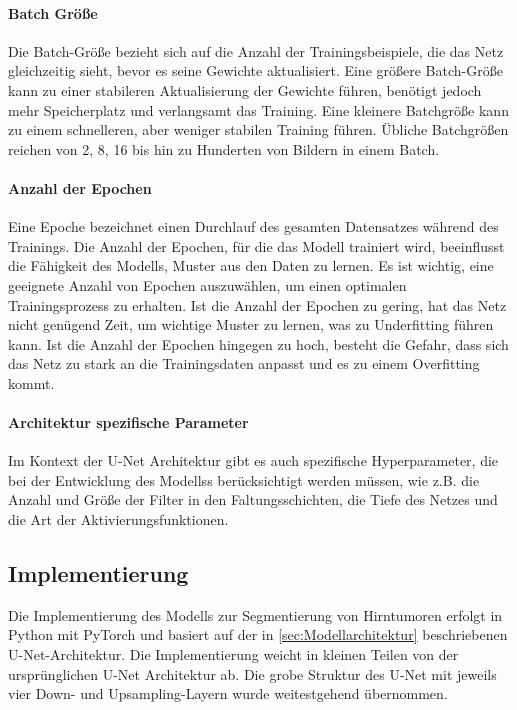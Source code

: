 \paragraph{Batch Größe} Die Batch-Größe bezieht sich auf die Anzahl der Trainingsbeispiele, die das Netz gleichzeitig sieht, bevor es seine Gewichte aktualisiert. Eine größere Batch-Größe kann zu einer stabileren Aktualisierung der Gewichte führen, benötigt jedoch mehr Speicherplatz und verlangsamt das Training. Eine kleinere Batchgröße kann zu einem schnelleren, aber weniger stabilen Training führen. Übliche Batchgrößen reichen von 2, 8, 16 bis hin zu Hunderten von Bildern in einem Batch. \cite[vgl.][]{Yu2020}

\paragraph{Anzahl der Epochen} Eine Epoche bezeichnet einen Durchlauf des gesamten Datensatzes während des Trainings. Die Anzahl der Epochen, für die das \gls{Modell} trainiert wird, beeinflusst die Fähigkeit des Modells, Muster aus den Daten zu lernen. Es ist wichtig, eine geeignete Anzahl von Epochen auszuwählen, um einen optimalen Trainingsprozess zu erhalten. Ist die Anzahl der Epochen zu gering, hat das Netz nicht genügend Zeit, um wichtige Muster zu lernen, was zu Underfitting führen kann. Ist die Anzahl der Epochen hingegen zu hoch, besteht die Gefahr, dass sich das Netz zu stark an die Trainingsdaten anpasst und es zu einem Overfitting kommt. \cite[vgl.][]{Goodfellow2016}

\paragraph{Architektur spezifische Parameter} Im Kontext der U-Net Architektur gibt es auch spezifische Hyperparameter, die bei der Entwicklung des \glspl{Modell}s berücksichtigt werden müssen, wie z.B. die Anzahl und Größe der Filter in den Faltungsschichten, die Tiefe des Netzes und die Art der Aktivierungsfunktionen.


\subsection{Implementierung}
\label{subsec:Implementierung}
Die Implementierung des \gls{Modell}s zur Segmentierung von Hirntumoren erfolgt in Python mit PyTorch und basiert auf der in \ref{sec:Modellarchitektur} beschriebenen U-Net-Architektur. Die Implementierung weicht in kleinen Teilen von der ursprünglichen U-Net Architektur ab. Die grobe Struktur des U-Net mit jeweils vier Down- und Upsampling-Layern wurde weitestgehend übernommen.

